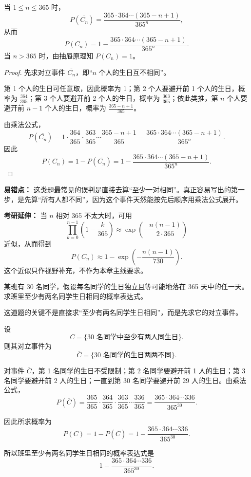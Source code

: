 ﻿\documentclass[lang=cn,11pt]{elegantbook}
\begin{document}
\begin{theorem}[生日问题的基本公式]\label{thm:birthday-model}
当 \(1\le n\le 365\) 时，
\[
P(\overline{C_n})=\frac{365\cdot364\cdots(365-n+1)}{365^n},
\]
从而
\[
P(C_n)=1-\frac{365\cdot364\cdots(365-n+1)}{365^n}.
\]
当 \(n>365\) 时，由抽屉原理知 \(P(C_n)=1\)。
\end{theorem}

\begin{proof}
先求对立事件 \(\overline{C_n}\)，即“\(n\) 个人的生日互不相同”。

第 1 个人的生日可任意取，因此概率为 1；第 2 个人要避开前 1 个人的生日，概率为 \(\frac{364}{365}\)；第 3 个人要避开前 2 个人的生日，概率为 \(\frac{363}{365}\)；依此类推，第 \(n\) 个人要避开前 \(n-1\) 个人的生日，概率为 \(\frac{365-n+1}{365}\)。

由乘法公式，
\[
P(\overline{C_n})
=1\cdot\frac{364}{365}\cdot\frac{363}{365}\cdots\frac{365-n+1}{365}
=\frac{365\cdot364\cdots(365-n+1)}{365^n}.
\]
因此
\[
P(C_n)=1-P(\overline{C_n})
=1-\frac{365\cdot364\cdots(365-n+1)}{365^n}.
\]
\end{proof}

\begin{note}
\textbf{易错点：} 这类题最常见的误判是直接去算“至少一对相同”。真正容易写出的第一步，是先算“所有人都不同”，因为这个事件天然能按先后顺序用乘法公式展开。

\textbf{考研延伸：} 当 \(n\) 相对 365 不太大时，可用
\[
\prod_{k=0}^{n-1}\left(1-\frac{k}{365}\right)
\approx \exp\!\left(-\frac{n(n-1)}{2\cdot365}\right)
\]
近似，从而得到
\[
P(C_n)\approx 1-\exp\!\left(-\frac{n(n-1)}{730}\right).
\]
这个近似只作视野补充，不作为本章主线要求。
\end{note}

\begin{exercise}[生日碰撞概率]\label{ex:birthday_collision}
某班有 30 名同学，假设每名同学的生日独立且等可能地落在 365 天中的任一天。求班里至少有两名同学生日相同的概率表达式。
\end{exercise}

\begin{solution}
这道题的关键不是直接求“至少有两名同学生日相同”，而是先求它的对立事件。

设
\[
C=\{\text{30 名同学中至少有两人同生日}\}.
\]
则其对立事件为
\[
\overline C=\{\text{30 名同学的生日两两不同}\}.
\]

对事件 \(\overline C\)，第 1 名同学的生日不受限制；第 2 名同学要避开前 1 人的生日；第 3 名同学要避开前 2 人的生日；一直到第 30 名同学要避开前 29 人的生日。由乘法公式，
\[
P(\overline C)
=\frac{365}{365}\cdot\frac{364}{365}\cdot\frac{363}{365}\cdots\frac{336}{365}
=\frac{365\cdot364\cdots336}{365^{30}}.
\]

因此所求概率为
\[
P(C)=1-P(\overline C)
=1-\frac{365\cdot364\cdots336}{365^{30}}.
\]

所以班里至少有两名同学生日相同的概率表达式是
\[
1-\frac{365\cdot364\cdots336}{365^{30}}.
\]
\end{solution}
\end{document}
